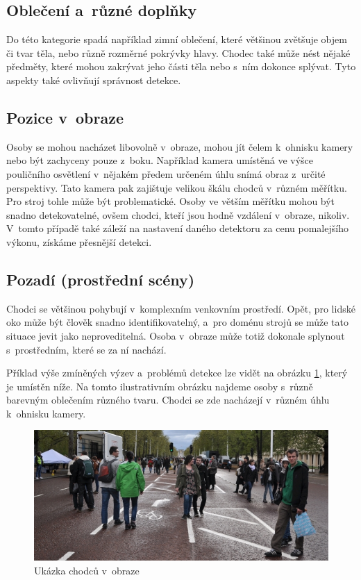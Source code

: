 \subsection{Oblečení a~různé doplňky}
Do této kategorie spadá například zimní oblečení, které většinou zvětšuje objem či tvar těla, nebo různě rozměrné pokrývky hlavy. Chodec také může nést nějaké předměty, které mohou zakrývat jeho části těla nebo s~ním dokonce splývat. Tyto aspekty také ovlivňují správnost detekce.

\subsection{Pozice v~obraze}
Osoby se mohou nacházet libovolně v~obraze, mohou jít čelem k~ohnisku kamery nebo být zachyceny pouze z~boku. Například kamera umístěná ve výšce pouličního osvětlení v~nějakém předem určeném úhlu snímá obraz z~určité perspektivy. Tato kamera pak zajištuje velikou škálu chodců v~různém měřítku. Pro stroj tohle může být problematické. Osoby ve větším měřítku mohou být snadno detekovatelné, ovšem chodci, kteří jsou hodně vzdálení v~obraze, nikoliv. V~tomto případě také záleží na nastavení daného detektoru za cenu pomalejšího výkonu, získáme přesnější detekci. 

\subsection{Pozadí (prostřední scény)}
Chodci se většinou pohybují v~komplexním venkovním prostředí. Opět, pro lidské oko může být člověk snadno identifikovatelný, a~pro doménu strojů se může tato situace jevit jako neproveditelná. Osoba v~obraze může totiž dokonale splynout s~prostředním, které se za ní nachází.  

Příklad výše zmíněných výzev a~problémů detekce lze vidět na obrázku \ref{pedestrians}, který je umístěn níže. Na tomto ilustrativním obrázku najdeme osoby s~různě barevným oblečením různého tvaru. Chodci se zde nacházejí v~různém úhlu k~ohnisku kamery. 

\begin{figure}[H]
\centering
\includegraphics[width=15cm]{figures/pedestrians}
\caption{Ukázka chodců v~obraze}
\label{pedestrians}
\end{figure}